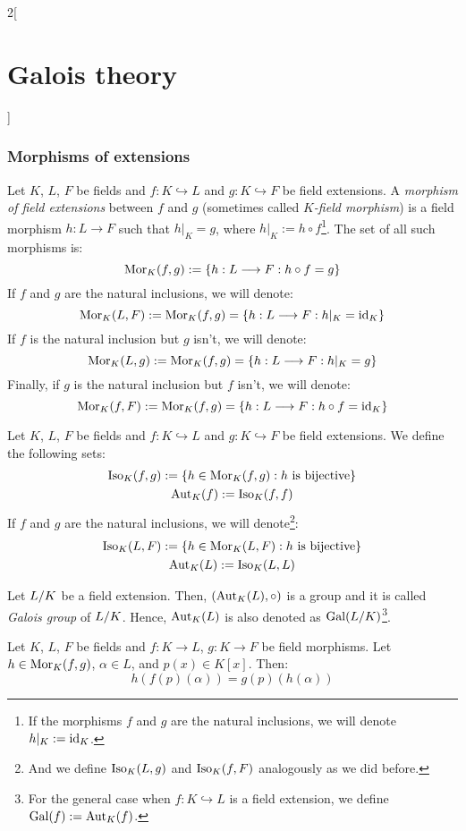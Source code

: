 \documentclass[../../../main.tex]{subfiles}
\begin{document}
\begin{multicols}{2}[\section{Galois theory}]
  \subsubsection{Morphisms of extensions}
  \begin{definition}
    Let $K$, $L$, $F$ be fields and $f:K\hookrightarrow L$ and $g:K\hookrightarrow F$ be field extensions. A \emph{morphism of field extensions} between $f$ and $g$ (sometimes called \emph{$K$-field morphism}) is a field morphism $h:L\rightarrow F$ such that $h|_K=g$, where $h|_K:=h\circ f$\footnote{If the morphisms $f$ and $g$ are the natural inclusions, we will denote $h|_K:=\mathrm{id}_K$.}. The set of all such morphisms is:
    $$\operatorname{Mor}_K(f,g):=\{h:L\longrightarrow F:h\circ f=g\}$$
    If $f$ and $g$ are the natural inclusions, we will denote: $$\operatorname{Mor}_K(L,F):=\operatorname{Mor}_K(f,g)=\{h:L\longrightarrow F:h|_K=\mathrm{id}_K\}$$
    If $f$ is the natural inclusion but $g$ isn't, we will denote: $$\operatorname{Mor}_K(L,g):=\operatorname{Mor}_K(f,g)=\{h:L\longrightarrow F:h|_K=g\}$$
    Finally, if $g$ is the natural inclusion but $f$ isn't, we will denote: $$\operatorname{Mor}_K(f,F):=\operatorname{Mor}_K(f,g)=\{h:L\longrightarrow F:h\circ f=\mathrm{id}_K\}$$
  \end{definition}
  \begin{definition}
    Let $K$, $L$, $F$ be fields and $f:K\hookrightarrow L$ and $g:K\hookrightarrow F$ be field extensions. We define the following sets:
    \begin{gather*}
      \operatorname{Iso}_K(f,g):=\{h\in\operatorname{Mor}_K(f,g):h\text{ is bijective}\} \\
      \operatorname{Aut}_K(f):=\operatorname{Iso}_K(f,f)
    \end{gather*}
    If $f$ and $g$ are the natural inclusions, we will denote\footnote{And we define $\operatorname{Iso}_K(L,g)$ and $\operatorname{Iso}_K(f,F)$ analogously as we did before.}:
    \begin{gather*}
      \operatorname{Iso}_K(L,F):=\{h\in\operatorname{Mor}_K(L,F):h\text{ is bijective}\} \\
      \operatorname{Aut}_K(L):=\operatorname{Iso}_K(L,L)
    \end{gather*}
  \end{definition}
  \begin{lemma}
    Let $\quot{L}{K}$ be a field extension. Then, $(\operatorname{Aut}_K(L),\circ)$ is a group and it is called \emph{Galois group} of $\quot{L}{K}$. Hence, $\operatorname{Aut}_K(L)$ is also denoted as $\Gal(\quot{L}{K})$\footnote{For the general case when $f:K\hookrightarrow L$ is a field extension, we define $\operatorname{Gal}(f):=\operatorname{Aut}_K(f)$.}.
  \end{lemma}
  \begin{lemma}
    Let $K$, $L$, $F$ be fields and $f:K\rightarrow L$, $g:K \rightarrow F$ be field morphisms. Let $h\in\operatorname{Mor}_K(f,g)$, $\alpha\in L$, and $p(x)\in K[x]$. Then: $$h(f(p)(\alpha))=g(p)(h(\alpha))$$

\end{lemma}
\end{multicols}
\end{document}
